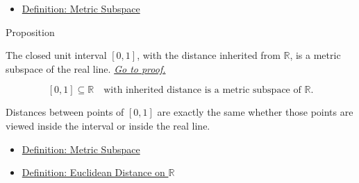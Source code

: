 
\begin{dependencies}
\begin{itemize}
  \item \hyperref[def:metric-subspace]{Definition: Metric Subspace}
\end{itemize}
\end{dependencies}

\begin{propositionbox}{Proposition}
\begin{proposition}
\label{prop:closed-unit-interval-metric-subspace}
The closed unit interval \([0,1]\), with the distance inherited from
\(\mathbb{R}\), is a metric subspace of the real line.
\hyperref[prf:closed-unit-interval-metric-subspace]{\textit{Go to proof.}}
\end{proposition}
\end{propositionbox}

\begin{remark*}
\[
[0,1]\subseteq\mathbb{R}
\quad\text{with inherited distance is a metric subspace of }\mathbb{R}.
\]
\end{remark*}

\begin{remark*}[Interpretation]
Distances between points of \([0,1]\) are exactly the same whether those
points are viewed inside the interval or inside the real line.
\end{remark*}


\begin{dependencies}
\begin{itemize}
  \item \hyperref[def:metric-subspace]{Definition: Metric Subspace}
  \item \hyperref[def:real-line-euclidean-distance]{Definition: Euclidean Distance on \(\mathbb{R}\)}
\end{itemize}
\end{dependencies}

